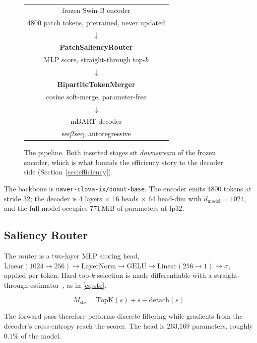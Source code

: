 \documentclass[conference]{IEEEtran}
\begin{document}
\begin{figure}[htbp]
\centering
\footnotesize
\setlength{\tabcolsep}{3pt}
\renewcommand{\arraystretch}{1.25}
\begin{tabular}{@{}c@{}}
\toprule
frozen Swin-B encoder \\
\footnotesize 4800 patch tokens, pretrained, never updated \\
\midrule
$\downarrow$ \\
\midrule
\textbf{PatchSaliencyRouter} \\
\footnotesize MLP score, straight-through top-$k$ \\
\midrule
$\downarrow$ \\
\midrule
\textbf{BipartiteTokenMerger} \\
\footnotesize cosine soft-merge, parameter-free \\
\midrule
$\downarrow$ \\
\midrule
mBART decoder \\
\footnotesize seq2seq, autoregressive \\
\bottomrule
\end{tabular}
\caption{The pipeline. Both inserted stages sit \emph{downstream} of the frozen encoder,
which is what bounds the efficiency story to the decoder side
(Section~\ref{sec:efficiency}).}
\label{fig:arch}
\end{figure}

The backbone is \texttt{naver-clova-ix/donut-base}. The encoder emits 4800 tokens at stride
32; the decoder is 4 layers $\times$ 16 heads $\times$ 64 head-dim with
$d_{\text{model}} = 1024$, and the full model occupies 771\,MiB of parameters at fp32.

\subsection{Saliency Router}
\label{sec:router}

The router is a two-layer MLP scoring head, $\mathrm{Linear}(1024 \rightarrow 256)
\rightarrow \mathrm{LayerNorm} \rightarrow \mathrm{GELU} \rightarrow
\mathrm{Linear}(256 \rightarrow 1) \rightarrow \sigma$, applied per token. Hard top-$k$
selection is made differentiable with a straight-through estimator~\cite{ste}, as in
\eqref{eq:ste}.

\begin{equation} \label{eq:ste}
M_{\text{ste}} = \mathrm{TopK}(s) + s - \mathrm{detach}(s)
\end{equation}

The forward pass therefore performs discrete filtering while gradients from the decoder's
cross-entropy reach the scorer. The head is 263{,}169 parameters, roughly $0.1\%$ of the
model.
\end{document}
